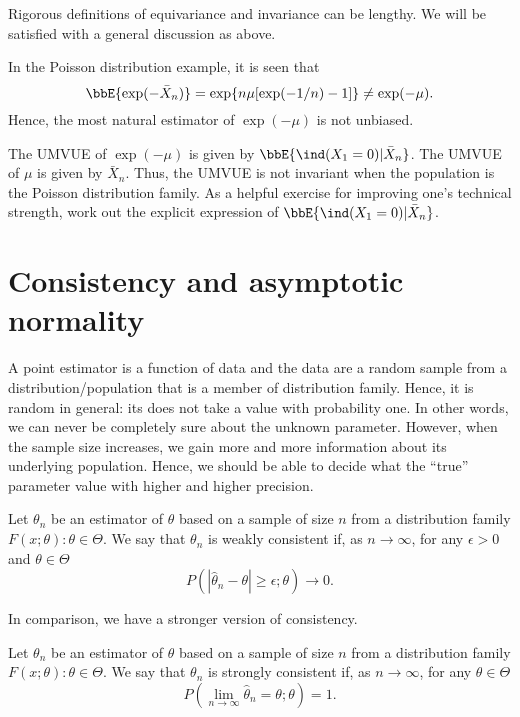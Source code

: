 Rigorous definitions of equivariance and invariance can
be lengthy. We will be satisfied with a general discussion
as above. 

In the Poisson distribution example, it is seen that
\[
\bbE\{ \exp(- \bar X_n)\}
= 
\exp \{ n \mu [ \exp( - 1/n) - 1] \} 
\neq 
\exp(- \mu).
\]
Hence, the most natural estimator of $\exp(-\mu)$ is not unbiased.

The UMVUE of $\exp( - \mu)$ is given by
$\bbE\{\ind(X_1 = 0)| \bar X_n\}$.
The UMVUE of $\mu$ is given by $\bar X_n$.
Thus, the UMVUE is not invariant when the population
is the Poisson distribution family. As a helpful exercise for
improving one's technical strength, work out the explicit 
expression of $\bbE\{\ind(X_1 = 0)| \bar X_n\}$.

\section{Consistency and asymptotic normality}

A point estimator is a function of data and the data are a
random sample from a distribution/population that is a member
of distribution family. Hence, it is random in general: its does
not take a value with probability one. In other words, we can
never be completely sure about the unknown parameter.
However, when the sample size increases, we gain more
and more information about its underlying population.
Hence, we should be able to decide what the ``true'' parameter
value with higher and higher precision.

\begin{defi}
Let $\theta_n$ be an estimator of $\theta$ based on a sample
of size $n$ from a distribution family $F(x; \theta): \theta \in \Theta$. 
We say that $\theta_n$ is weakly consistent
if, as $n \to \infty$, for any $\epsilon > 0$ and $\theta \in \Theta$
\[
P( | \hat \theta_n - \theta| \geq \epsilon;  \theta) \to 0.
\]
\end{defi}

In comparison, we have a stronger version of consistency.

\begin{defi}
Let $\theta_n$ be an estimator of $\theta$ based on a sample
of size $n$ from a distribution family $F(x; \theta): \theta \in \Theta$. 
We say that $\theta_n$ is strongly consistent
if, as $n \to \infty$, for any $\theta \in \Theta$
\[
P( \lim_{n \to \infty} \hat \theta_n= \theta; \theta) = 1.
\]
\end{defi}

